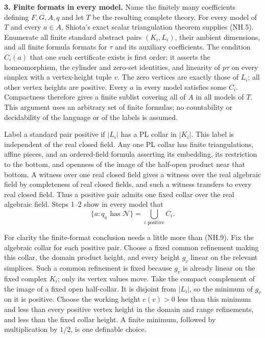 \textbf{3. Finite formats in every model.}
Name the finitely many coefficients defining $F,G,A,q$ and let $T$ be the
resulting complete theory. For every model of $T$ and every $a\in A$,
Shiota's exact scalar triangulation theorem supplies (NH.5). Enumerate all
finite standard abstract pairs $(K_i,L_i)$, their ambient dimensions, and
all finite formula formats for $\tau$ and its auxiliary coefficients.
The condition $C_i(a)$ that one such certificate exists is first order:
it asserts the homeomorphism, the cylinder and zero-set identities, and
linearity of $p\tau$ on every simplex with a vertex-height tuple $v$.
The zero vertices are exactly those of $L_i$; all other vertex heights
are positive. Every $a$ in every model satisfies some $C_i$. Compactness
therefore gives a finite sublist covering all of $A$ in all models of $T$.
This argument uses an arbitrary set of finite formulas; no countability
or decidability of the language or of the labels is assumed.

Label a standard pair positive if $|L_i|$ has a PL collar in $|K_i|$.
This label is independent of the real closed field. Any one PL collar
has finite triangulations, affine pieces, and an ordered-field formula
asserting its embedding, its restriction to the bottom, and openness of
the image of the half-open product near that bottom. A witness over one
real closed field gives a witness over the real algebraic field by
completeness of real closed fields, and such a witness transfers to every
real closed field. Thus a positive pair admits one fixed collar over the
real algebraic field. Steps 1--2 show in every model that
\[
 \{a:q_a\text{ has }\mathcal N\}
       =\bigcup_{i\text{ positive}} C_i.                         \tag{NH.9}
\]

For clarity the finite-format conclusion needs a little more than (NH.9).
Fix the algebraic collar for each positive pair. Choose a fixed common
refinement making this collar, the domain product height, and every
height $g_v$ linear on the relevant simplices. Such a common refinement
is fixed because $g_v$ is already linear on the fixed complex $K_i$;
only its vertex values move. Take the compact complement of the image
of a fixed open half-collar. It is disjoint from $|L_i|$, so the minimum
of $g_v$ on it is positive. Choose the working height $e(v)>0$ less than
this minimum and less than every positive vertex height in the domain
and range refinements, and less than the fixed collar height. A finite
minimum, followed by multiplication by $1/2$, is one definable choice.

